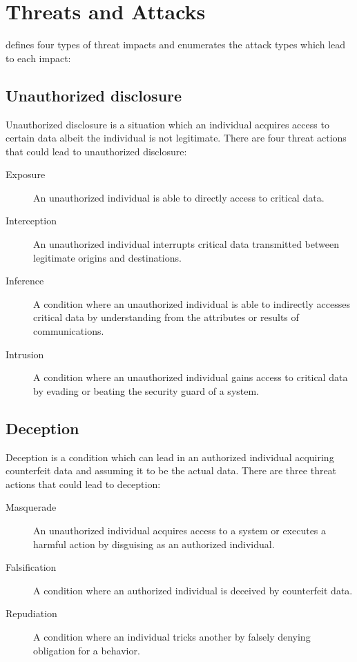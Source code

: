 \documentclass[../index.tex]{subfiles}
\begin{document}
\section{Threats and Attacks}

 defines four types of threat impacts and enumerates the attack types which lead to each
impact:

\subsection{Unauthorized disclosure}

Unauthorized disclosure is a situation which an individual acquires access to certain data albeit
the individual is not legitimate. There are four threat actions that could lead to unauthorized
disclosure:

\begin{description}

  \item[Exposure] An unauthorized individual is able to directly access to critical data.

  \item[Interception] An unauthorized individual interrupts critical data transmitted between
    legitimate origins and destinations.

  \item[Inference] A condition where an unauthorized individual is able to indirectly accesses
    critical data by understanding from the attributes or results of communications.

  \item[Intrusion] A condition where an unauthorized individual gains access to critical data by
    evading or beating the security guard of a system.

\end{description}

\subsection{Deception}

Deception is a condition which can lead in an authorized individual acquiring counterfeit data and
assuming it to be the actual data. There are three threat actions that could lead to deception:

\begin{description}

  \item[Masquerade] An unauthorized individual acquires access to a system or executes a harmful
    action by disguising as an authorized individual.

  \item[Falsification] A condition where an authorized individual is deceived by counterfeit data.

  \item[Repudiation] A condition where an individual tricks another by falsely denying obligation
    for a behavior.

\end{description}
\end{document}
